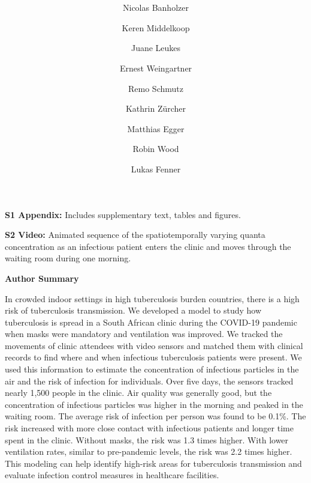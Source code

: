 \documentclass[fleqn,11pt]{wlscirep}
\begin{document}
\doublespacing

\title{\bfseries\LARGE{}}
\author[1]{Nicolas Banholzer}
\author[2]{Keren Middelkoop}
\author[2]{Juane Leukes}
\author[3]{Ernest Weingartner}
\author[1]{Remo Schmutz}
\author[1]{Kathrin Zürcher}
\author[1,4,5]{Matthias Egger}
\author[2]{Robin Wood}
\author[1*]{Lukas Fenner}



\vspace{1em}

\begin{information}

\noindent\noindent\textbf{S1 Appendix:} Includes supplementary text, tables and figures.

\noindent\textbf{S2 Video:} Animated sequence of the spatiotemporally varying quanta concentration as an infectious patient enters the clinic and moves through the waiting room during one morning.

\clearpage

\noindent\large{\textbf{Author Summary}}

\noindent In crowded indoor settings in high tuberculosis burden countries, there is a high risk of tuberculosis transmission. We developed a model to study how tuberculosis is spread in a South African clinic during the COVID-19 pandemic when masks were mandatory and ventilation was improved. We tracked the movements of clinic attendees with video sensors and matched them with clinical records to find where and when infectious tuberculosis patients were present. We used this information to estimate the concentration of infectious particles in the air and the risk of infection for individuals. Over five days, the sensors tracked nearly 1,500 people in the clinic. Air quality was generally good, but the concentration of infectious particles was higher in the morning and peaked in the waiting room. The average risk of infection per person was found to be 0.1\%. The risk increased with more close contact with infectious patients and longer time spent in the clinic. Without masks, the risk was 1.3 times higher. With lower ventilation rates, similar to pre-pandemic levels, the risk was 2.2 times higher. This modeling can help identify high-risk areas for tuberculosis transmission and evaluate infection control measures in healthcare facilities.

\end{information}
\end{document}
